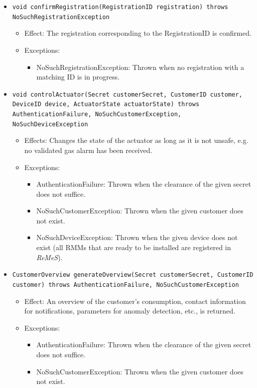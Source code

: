 \documentclass[a4paper,10pt]{article}
\newcommand{\rem}{\emph{ReMeS}\xspace}
\begin{document}
\begin{itemize}
\begin{itemize}
        \item \texttt{void confirmRegistration(RegistrationID registration) throws NoSuchRegistrationException}
        \begin{itemize}
            \item Effect: The registration corresponding to the RegistrationID is confirmed.
            \item Exceptions:
            	\begin{itemize}
                	\item NoSuchRegistrationException: Thrown when no registration with a matching ID is in progress.
                \end{itemize}
        \end{itemize}
        
        \item \texttt{void controlActuator(Secret customerSecret, CustomerID customer, DeviceID device, ActuatorState actuatorState) throws AuthenticationFailure, NoSuchCustomerException, NoSuchDeviceException}
        \begin{itemize}
        	\item Effects: Changes the state of the actuator as long as it is not unsafe, e.g. no validated gas alarm has been received.
        	\item Exceptions:
            \begin{itemize}
            	\item AuthenticationFailure: Thrown when the clearance of the given secret does not suffice.
            	\item NoSuchCustomerException: Thrown when the given customer does not exist.
                \item NoSuchDeviceException: Thrown when the given device does not exist (all RMMs that are ready to be installed are registered in \rem).
            \end{itemize}
        \end{itemize}
        
    	\item \texttt{CustomerOverview generateOverview(Secret customerSecret, CustomerID customer) throws AuthenticationFailure, NoSuchCustomerException}
        \begin{itemize}
        	\item Effect: An overview of the customer's consumption, contact information for notifications, parameters for anomaly detection, etc., is returned.
            \item Exceptions:
            \begin{itemize}
            	\item AuthenticationFailure: Thrown when the clearance of the given secret does not suffice.
            	\item NoSuchCustomerException: Thrown when the given customer does not exist.
            \end{itemize}
        \end{itemize}
        

\end{itemize}
\end{itemize}
\end{document}

